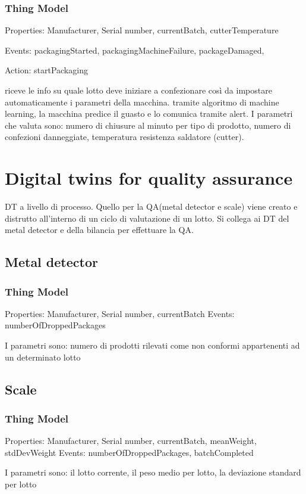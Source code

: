 \subsubsection{Thing Model}
Properties: Manufacturer, Serial number, currentBatch, cutterTemperature

Events: packagingStarted, packagingMachineFailure, packageDamaged,

Action: startPackaging


riceve le info su quale lotto deve iniziare a confezionare così da impostare automaticamente i parametri della macchina.
tramite algoritmo di machine learning, la macchina predice il guasto e lo comunica tramite alert.
I parametri che valuta sono: numero di chiusure al minuto per tipo di prodotto, numero di confezioni danneggiate, temperatura resistenza saldatore (cutter).

\section{Digital twins for quality assurance}
DT a livello di processo. Quello per la QA(metal detector e scale) viene creato e distrutto all'interno di un ciclo di valutazione di un lotto.
Si collega ai DT del metal detector e della bilancia per effettuare la QA.
\subsection{Metal detector}
\subsubsection{Thing Model}
Properties: Manufacturer, Serial number, currentBatch
Events: numberOfDroppedPackages

I parametri sono:
numero di prodotti rilevati come non conformi appartenenti ad un determinato lotto

\subsection{Scale}
\subsubsection{Thing Model}
Properties: Manufacturer, Serial number, currentBatch, meanWeight, stdDevWeight
Events: numberOfDroppedPackages, batchCompleted

I parametri sono:
il lotto corrente, il peso medio per lotto, la deviazione standard per lotto
